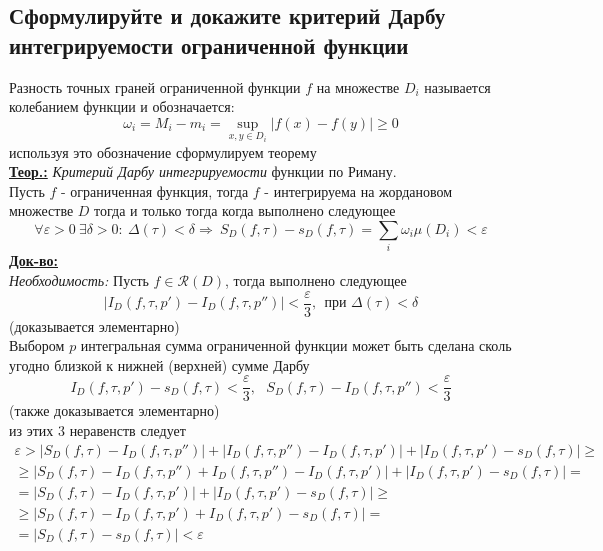 
\subsection{Сформулируйте и докажите критерий Дарбу интегрируемости ограниченной функции}

Разность точных граней ограниченной функции $f$ на множестве $D_i$ называется колебанием функции и обозначается:
\[\omega_i = M_i - m_i = \sup_{x,y\in D_i}{|f(x) - f(y)|} \geq 0\]
используя это обозначение сформулируем теорему\\
\textbf{\underline{Теор.:} } \textit{Критерий Дарбу интегрируемости} функции по Риману. \\
Пусть $f$ - ограниченная функция, тогда $f$ - интегрируема на жордановом множестве $D$ тогда и только тогда когда выполнено следующее
\[\forall \varepsilon > 0 \ \exists \delta > 0: \ \Delta(\tau) < \delta \Rightarrow \ S_D(f, \tau) - s_D(f, \tau) = \sum\limits_i\omega_i\mu(D_i) < \varepsilon\]
\textbf{\underline{Док-во:} } \\
\textit{Необходимость: }Пусть $f \in \mathcal{R}(D)$, тогда выполнено следующее
\[|I_D(f, \tau, p') - I_D(f, \tau, p'')| < \frac{\varepsilon}{3}, \ \ \text{при } \Delta(\tau) < \delta\]
(доказывается элементарно) \\
Выбором $p$ интегральная сумма ограниченной функции может быть сделана сколь угодно близкой к нижней (верхней) сумме Дарбу
\[I_D(f, \tau, p') - s_D(f, \tau) < \frac{\varepsilon}{3}, \ \ \ S_D(f, \tau) - I_D(f, \tau, p'') < \frac{\varepsilon}{3}\]
(также доказывается элементарно) \\
из этих 3 неравенств следует
\begin{multline*}
    \varepsilon > |S_D(f, \tau) - I_D(f, \tau, p'')| + |I_D(f, \tau, p'') - I_D(f, \tau, p')| + |I_D(f, \tau, p') - s_D(f, \tau)| \geq \\ \geq |S_D(f, \tau) - I_D(f, \tau, p'') + I_D(f, \tau, p'') - I_D(f, \tau, p')| + |I_D(f, \tau, p') - s_D(f, \tau)| = \\ = |S_D(f, \tau) - I_D(f, \tau, p')| + |I_D(f, \tau, p') - s_D(f, \tau)| \geq \\ \geq |S_D(f, \tau) - I_D(f, \tau, p') + I_D(f, \tau, p') - s_D(f, \tau)| = \\ = |S_D(f, \tau) - s_D(f, \tau)| < \varepsilon
\end{multline*}
